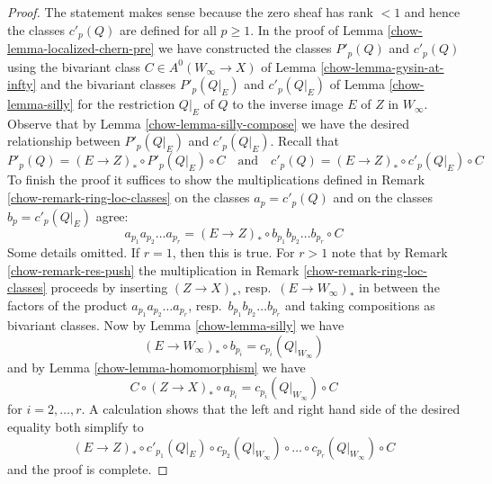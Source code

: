 \begin{proof}

The statement makes sense because the zero sheaf has rank $< 1$ and
hence the classes $c'_p(Q)$ are defined for all $p \geq 1$.
In the proof of Lemma \ref{chow-lemma-localized-chern-pre} we have constructed
the classes $P'_p(Q)$ and $c'_p(Q)$ using the bivariant class
$C \in A^0(W_\infty \to X)$ of Lemma \ref{chow-lemma-gysin-at-infty}
and the bivariant classes
$P'_p(Q|_E)$ and $c'_p(Q|_E)$ of Lemma \ref{chow-lemma-silly} for the restriction
$Q|_E$ of $Q$ to the inverse image $E$ of $Z$ in $W_\infty$.
Observe that by Lemma \ref{chow-lemma-silly-compose} we have the desired
relationship between $P'_p(Q|_E)$ and $c'_p(Q|_E)$. Recall that
$$
P'_p(Q) = (E \to Z)_* \circ P'_p(Q|_E) \circ C
\quad\text{and}\quad
c'_p(Q) = (E \to Z)_* \circ c'_p(Q|_E) \circ C
$$
To finish the proof it suffices to show the multiplications defined
in Remark \ref{chow-remark-ring-loc-classes} on the classes $a_p = c'_p(Q)$
and on the classes $b_p = c'_p(Q|_E)$ agree:
$$
a_{p_1}a_{p_2} \ldots a_{p_r} =
(E \to Z)_* \circ b_{p_1}b_{p_2} \ldots b_{p_r} \circ C
$$
Some details omitted. If $r = 1$, then this is true.
For $r > 1$ note that by Remark \ref{chow-remark-res-push} the multiplication in
Remark \ref{chow-remark-ring-loc-classes} proceeds
by inserting $(Z \to X)_*$, resp.\ $(E \to W_\infty)_*$ in between
the factors of the product
$a_{p_1}a_{p_2} \ldots a_{p_r}$, resp.\ $b_{p_1}b_{p_2} \ldots b_{p_r}$
and taking compositions as bivariant classes.
Now by Lemma \ref{chow-lemma-silly} we have
$$
(E \to W_\infty)_* \circ b_{p_i} = c_{p_i}(Q|_{W_\infty})
$$
and by Lemma \ref{chow-lemma-homomorphism} we have
$$
C \circ (Z \to X)_* \circ a_{p_i} = c_{p_i}(Q|_{W_\infty}) \circ C
$$
for $i = 2, \ldots, r$. A calculation
shows that the left and right hand side of the desired
equality both simplify to
$$
(E \to Z)_* \circ c'_{p_1}(Q|_E) \circ
c_{p_2}(Q|_{W_\infty}) \circ \ldots \circ
c_{p_r}(Q|_{W_\infty}) \circ C
$$
and the proof is complete.
\end{proof}


